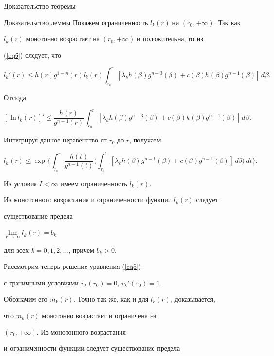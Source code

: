 \begin{pf*}{Доказательство теоремы}
\begin{pf*}{Доказательство леммы}
Покажем ограниченность $l_k(r)$ на $(r_0,+\infty)$. Так как


$l_k(r)$ монотонно возрастает на $(r_0,+\infty)$ и положительна, то из


(\ref{eq6}) следует, что


$$


l_k'(r)\le h(r)g^{1-n}(r)l_k(r)\int_{r_0}^r[\lambda_kh(\beta)


g^{n-3}(\beta)+c(\beta)h(\beta)g^{n-1}(\beta)]\,d\beta.


$$


Отсюда


$$


[\ln l_k(r)]'\le \frac{h(r)}{g^{n-1}(r)}\int_{r_0}^r


[\lambda_kh(\beta)g^{n-3}(\beta)+c(\beta)h(\beta)g^{n-1}(\beta)]\,


d\beta.


$$


Интегрируя данное неравенство от $r_0$ до $r$, получаем


$$


l_k(r)\le \exp\biggl\{\int_{r_0}^r \frac{h(t)}{g^{n-1}(t)}


\biggl(\int_{r_0}^t[\lambda_k h(\beta)g^{n-3}(\beta)+c(\beta)g^{n-1}(\beta)]


\,d\beta\biggr)\,dt\biggr\}.


$$


Из условия $I<\infty$ имеем ограниченность $l_k(r)$.





Из монотонного возрастания и ограниченности функции $l_k(r)$ следует


существование предела


$\lim\limits_{r\to \infty}l_k(r)=b_k$


для всех $k=0,1,2,\dotsc$, причем $b_k>0$.





Рассмотрим теперь решение уравнения (\ref{eq5})


с граничными условиями $v_k(r_0){=}0$, $v_k'(r_0){=}1$.


Обозначим его $m_k(r)$. Точно так же, как и для $l_k(r)$, доказывается,


что $m_k(r)$ монотонно возрастает и ограничена на


$(r_0,+\infty)$. Из монотонного возрастания


и ограниченности функции следует существование предела



\end{pf*}
\end{pf*}
